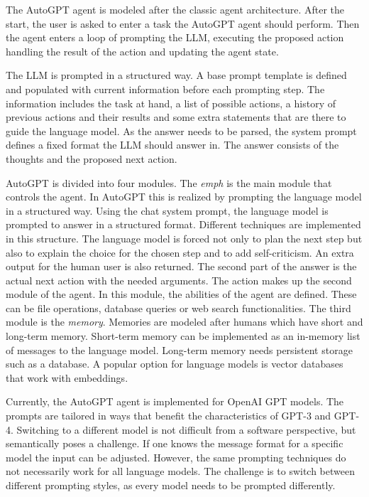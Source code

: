 \documentclass[../main.tex]{subfiles}
\begin{document}
The AutoGPT agent is modeled after the classic agent architecture.
After the start,
the user is asked to enter a task the AutoGPT agent should perform.
Then the agent enters a loop of prompting the LLM,
executing the proposed action
handling the result of the action and updating the agent state.

The LLM is prompted in a structured way.
A base prompt template is defined
and populated with current information before each prompting step.
The information includes the task at hand,
a list of possible actions,
a history of previous actions and their results
and some extra statements that are there to guide the language model.
As the answer needs to be parsed,
the system prompt defines a fixed format the LLM should answer in.
The answer consists of the thoughts and the proposed next action.

AutoGPT is divided into four modules.
The \textit{emph} is the main module that controls the agent.
In AutoGPT this is realized by prompting the language model in a structured way.
Using the chat system prompt,
the language model is prompted to answer in a structured format.
Different techniques are implemented in this structure.
The language model is forced not only to plan the next step
but also to explain the choice for the chosen step and to add self-criticism.
An extra output for the human user is also returned.
The second part of the answer is the actual next action with the needed arguments.
The action makes up the second module of the agent.
In this module, the abilities of the agent are defined.
These can be file operations,
database queries or web search functionalities.
The third module is the \emph{memory}.
Memories are modeled after humans which have short and long-term memory.
Short-term memory can be implemented
as an in-memory list of messages to the language model.
Long-term memory needs persistent storage such as a database.
A popular option for language models is vector databases that work with embeddings.

Currently,
the AutoGPT agent is implemented for OpenAI GPT models.
The prompts are tailored in ways
that benefit the characteristics of GPT-3 and GPT-4.
Switching to a different model is not difficult from a software perspective,
but semantically poses a challenge.
If one knows the message format for a specific model the input can be adjusted.
However, the same prompting techniques do not necessarily work for all language models.
The challenge is to switch between different prompting styles,
as every model needs to be prompted differently.
\end{document}
